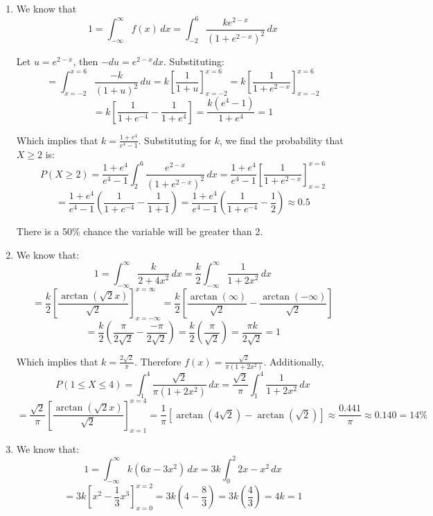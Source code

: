 \begin{Answer}[ref = int_pdf]
\begin{enumerate}
    \item We know that
	$$1 = \int_{-\infty}^{\infty} f(x)\,dx = \int_{-2}^{6} \frac{ke^{2 - x}}{
	\left( 1 + e^{2 - x} \right)^2}\,dx$$

	Let $u = e^{2 - x}$, then $-du = e^{2 - x}dx$. Substituting:
	$$= \int_{x = -2}^{x = 6} \frac{-k}{\left(1 + u \right)^2}\,du = k \left[
	 \frac{1}{1 + u} \right]_{x = -2}^{x = 6} = k \left[ \frac{1}{1 + e^{2 - x}} 
	 \right]_{x = -2}^{x = 6}$$
	$$= k \left[ \frac{1}{1 + e^{-4}} - \frac{1}{1 + e^4} \right] = \frac{k \left(
	e^4 - 1 \right)}{1 + e^4} = 1$$

	Which implies that $k = \frac{1 + e^4}{e^4 - 1}$. Substituting for $k$, we 
	find the probability that $X \geq 2$ is:
	$$P(X \geq 2) = \frac{1 + e^4}{e^4 - 1} \int_2^6 \frac{e^{2 - x}}{\left( 1 + 
	e^{2 - x} \right)^2}\,dx = \frac{1 + e^4}{e^4 - 1} \left[ \frac{1}{1 + e^{2 - 
	x}} \right]_{x = 2}^{x = 6}$$
	$$= \frac{1 + e^4}{e^4 - 1} \left( \frac{1}{1 + e^{-4}} - \frac{1}{1 + 1} 
	\right) = \frac{1 + e^4}{e^4 - 1} \left(\frac{1}{1 + e^{-4}} - \frac{1}{2} 
	\right) \approx 0.5$$

	There is a 50\% chance the variable will be greater than 2. 

    \item We know that:
    $$1 = \int_{-\infty}^{\infty} \frac{k}{2 + 4x^2}\,dx = \frac{k}{2} \int_{-
    \infty}^{\infty} \frac{1}{1 + 2x^2}\,dx$$
    $$= \frac{k}{2} \left[ \frac{\arctan{(\sqrt{2}x)}}{\sqrt{2}} \right]_{x = -
    \infty}^{x = \infty} = \frac{k}{2} \left[ \frac{\arctan{(\infty)}}{
    \sqrt{2}} - \frac{\arctan{(-\infty)}}{\sqrt{2}} \right] $$
    $$= \frac{k}{2} \left( \frac{\pi}{2\sqrt{2}} - \frac{-\pi}{2\sqrt{2}} 
    \right) = \frac{k}{2} \left( \frac{\pi}{\sqrt{2}} \right) = \frac{\pi k}{2
    \sqrt{2}} = 1$$

    Which implies that $k = \frac{2\sqrt{2}}{\pi}$. Therefore $f(x) = \frac{
    \sqrt{2}}{\pi \left(1 + 2x^2 \right)}$. Additionally, 
    $$P(1 \leq X \leq 4) = \int_1^4 \frac{\sqrt{2}}{\pi \left(1 + 2x^2 \right)
    }\,dx = \frac{\sqrt{2}}{\pi} \int_1^4 \frac{1}{1 + 2x^2}\,dx$$
    $$= \frac{\sqrt{2}}{\pi} \left[ \frac{\arctan{(\sqrt{2}x)}}{\sqrt{2}} 
    \right]_{x = 1}^{x = 4} = \frac{1}{\pi} \left[ \arctan{(4\sqrt{2})} - 
    \arctan{(\sqrt{2})} \right] \approx \frac{0.441}{\pi} \approx 0.140 = 14\%$$

    \item We know that:
    $$1 = \int_{-\infty}^{\infty} k \left(6x - 3x^2 \right)\,dx = 3k \int_{0}^{
    2} 2x - x^2\,dx$$
    $$= 3k \left[x^2 - \frac{1}{3}x^3 \right]_{x = 0}^{x = 2} = 3k \left( 4 - 
    \frac{8}{3} \right) = 3k \left( \frac{4}{3} \right) = 4k = 1$$


\end{enumerate}
\end{Answer}
